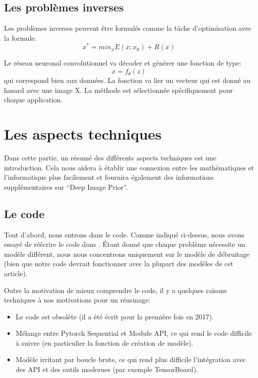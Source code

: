 \documentclass[
  11pt,
  dvipsnames]{article}
\providecommand{\tightlist}{%
  \setlength{\itemsep}{0pt}\setlength{\parskip}{0pt}}
\begin{document}
\hypertarget{les-probluxe8mes-inverses}{%
\subsection{Les problèmes inverses}\label{les-probluxe8mes-inverses}}

Les problèmes inverses peuvent être formulés comme la tâche d'optimisation avec la formule:
\[x^* = min_{x}E(x;x_{0}) + R(x)\]

Le réseau neuronal convolutionnel va décoder et générer une fonction de type:
\[x = f_{\theta}(z)\]
qui correspond bien aux données. La fonction va lier un vecteur qui est donné au hasard avec une image X. La méthode est sélectionnée spécifiquement pour chaque application.

\hypertarget{les-aspects-techniques}{%
\section{Les aspects techniques}\label{les-aspects-techniques}}

Dans cette partie, un résumé des différents aspects techniques est une introduction. Cela nous aidera à établir une connexion entre les mathématiques et l'informatique plus facilement et fournira également des informations supplémentaires sur ``Deep Image Prior''.

\hypertarget{le-code}{%
\subsection{Le code}\label{le-code}}

Tout d'abord, nous entrons dans le code. Comme indiqué ci-dessus, nous avons essayé de réécrire le code dans \autocite{1711.10925}. Étant donné que chaque problème nécessite un modèle différent, nous nous concentrons uniquement sur le modèle de débruitage (bien que notre code devrait fonctionner avec la plupart des modèles de cet article).

Outre la motivation de mieux comprendre le code, il y a quelques raisons techniques à nos motivations pour un réusinage:

\begin{itemize}
\tightlist
\item
  Le code est obsolète (il a été écrit pour la première fois en 2017).
\item
  Mélange entre Pytorch Sequential et Module API, ce qui rend le code difficile à suivre (en particulier la fonction de création de modèle).
\item
  Modèle irritant par boucle brute, ce qui rend plus difficile l'intégration avec des API et des outils modernes (par exemple TensorBoard).
\end{itemize}
\end{document}
